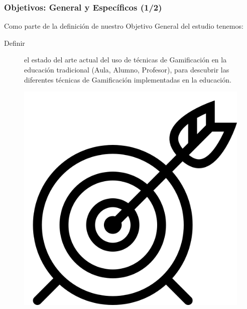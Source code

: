 \documentclass{beamer}
\begin{document}
\begin{frame}
	\frametitle{Objetivos: General y Específicos (1/2)}
	Como parte de la definición de nuestro Objetivo General del estudio tenemos:
	\begin{description}
		\item[Definir] el estado del arte actual del uso de técnicas de Gamificación en la educación tradicional (Aula, Alumno, Profesor), para descubrir las diferentes técnicas de Gamificación implementadas en la educación.
	\end{description}
	\begin{figure}
		\begin{center}
			\includegraphics[scale=0.1]{images/2icons/tarjet.png}
		\end{center}
	\end{figure}
\end{frame}
\end{document}
